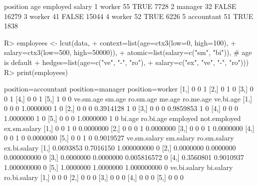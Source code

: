 \begin{Schunk}
% --begin: "lcut.data.frame2"
\begin{Soutput}
    position age employed salary
1     worker  55     TRUE   7728
2    manager  32    FALSE  16279
3     worker  41    FALSE  15044
4     worker  52     TRUE   6226
5 accountant  51     TRUE   1838
\end{Soutput}
\begin{Sinput}
R> employees <- lcut(data,
+                    context=list(age=ctx3(low=0, high=100),
+                                 salary=ctx3(low=500, high=50000)),
+                    atomic=list(salary=c("sm", "bi")), # age is default
+                    hedges=list(age=c("ve", "-", "ro"),
+                                salary=c("ex", "ve", "-", "ro")))
R> print(employees)
\end{Sinput}
\begin{Soutput}
     position=accountant position=manager position=worker
[1,]                   0                0               1
[2,]                   0                1               0
[3,]                   0                0               1
[4,]                   0                0               1
[5,]                   1                0               0
     ve.sm.age sm.age ro.sm.age    me.age ro.me.age ve.bi.age
[1,]         0      0         0 1.0000000         1         0
[2,]         0      0         0 0.3914128         1         0
[3,]         0      0         0 0.9859853         1         0
[4,]         0      0         0 1.0000000         1         0
[5,]         0      0         0 1.0000000         1         0
     bi.age ro.bi.age employed not.employed ex.sm.salary
[1,]      0         0        1            0    0.0000000
[2,]      0         0        0            1    0.0000000
[3,]      0         0        0            1    0.0000000
[4,]      0         0        1            0    0.0000000
[5,]      0         0        1            0    0.9019527
     ve.sm.salary sm.salary ro.sm.salary ex.bi.salary
[1,]    0.0693853 0.7016150  1.000000000            0
[2,]    0.0000000 0.0000000  0.000000000            0
[3,]    0.0000000 0.0000000  0.005816572            0
[4,]    0.3560801 0.9010937  1.000000000            0
[5,]    1.0000000 1.0000000  1.000000000            0
     ve.bi.salary bi.salary ro.bi.salary
[1,]            0         0            0
[2,]            0         0            0
[3,]            0         0            0
[4,]            0         0            0
[5,]            0         0            0
\end{Soutput}
%
% --end: "lcut.data.frame2"
\end{Schunk}

